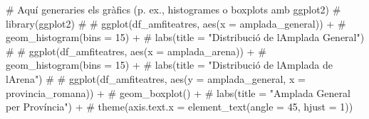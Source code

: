 \documentclass[
  12pt,
  letterpaper,
  DIV=11,
  numbers=noendperiod]{scrreprt}
\newenvironment{Shaded}{\begin{snugshade}}{\end{snugshade}}
\newcommand{\CommentTok}[1]{\textcolor[rgb]{0.37,0.37,0.37}{#1}}
\begin{document}
\begin{Shaded}
\begin{Highlighting}[]
\CommentTok{\# Aquí generaries els gràfics (p. ex., histogrames o boxplots amb ggplot2)}
\CommentTok{\# library(ggplot2)}
\CommentTok{\# }
\CommentTok{\# ggplot(df\_amfiteatres, aes(x = amplada\_general)) +}
\CommentTok{\#   geom\_histogram(bins = 15) +}
\CommentTok{\#   labs(title = "Distribució de l\textquotesingle{}Amplada General")}
\CommentTok{\# }
\CommentTok{\# ggplot(df\_amfiteatres, aes(x = amplada\_arena)) +}
\CommentTok{\#   geom\_histogram(bins = 15) +}
\CommentTok{\#   labs(title = "Distribució de l\textquotesingle{}Amplada de l\textquotesingle{}Arena")}
\CommentTok{\#}
\CommentTok{\# ggplot(df\_amfiteatres, aes(y = amplada\_general, x = provincia\_romana)) +}
\CommentTok{\#   geom\_boxplot() +}
\CommentTok{\#   labs(title = "Amplada General per Província") +}
\CommentTok{\#   theme(axis.text.x = element\_text(angle = 45, hjust = 1))}
\end{Highlighting}
\end{Shaded}
\end{document}
